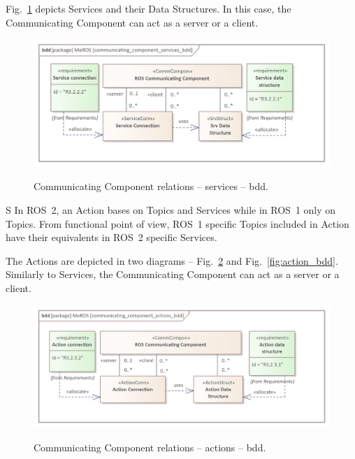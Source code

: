 Fig.~\ref{fig:communication_blocks_services_bdd} depicts Services and their Data Structures. In this case, the Communicating Component can act as a server or a client.


\begin{figure}[H]
    \centering
    \begin{center}
    {\includegraphics[scale=1.1]{../imgs/meros_pkg/communicating_component_services_bdd.png}}
    \end{center}
    \caption{Communicating Component relations -- services -- bdd.}
    \label{fig:communication_blocks_services_bdd}
\end{figure}
S
In ROS~2, an Action bases on Topics and Services while in ROS~1 only on Topics. From functional point of view, ROS~1 specific Topics included in Action have their equivalents in ROS~2 specific Services.

\pagebreak

The Actions are depicted in two diagrams -- Fig.~\ref{fig:communicating_component_actions_bdd} and Fig.~\ref{fig:action_bdd}. Similarly to Services, the Communicating Component can act as a server or a client.


\begin{figure}[H]
    \centering
    \begin{center}
    {\includegraphics[scale=1]{../imgs/meros_pkg/communicating_component_actions_bdd.png}}
    \end{center}
    \caption{Communicating Component relations -- actions -- bdd.}
    \label{fig:communicating_component_actions_bdd}
\end{figure}

